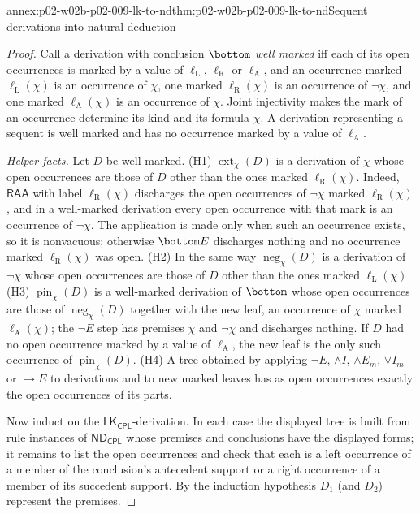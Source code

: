 \begin{annexitem}{annex:p02-w02b-p02-009-lk-to-nd}{thm:p02-w02b-p02-009-lk-to-nd}{Sequent derivations into natural deduction}
\begin{proof}
Call a derivation with conclusion \(\bottom\) \emph{well marked} iff each
of its open occurrences is marked by a value of \(\ell_{\mathrm L}\),
\(\ell_{\mathrm R}\) or \(\ell_{\mathrm A}\), and an occurrence marked
\(\ell_{\mathrm L}(\chi)\) is an occurrence of \(\chi\), one marked
\(\ell_{\mathrm R}(\chi)\) is an occurrence of \(\neg\chi\), and one marked
\(\ell_{\mathrm A}(\chi)\) is an occurrence of \(\chi\).  Joint injectivity
makes the mark of an occurrence determine its kind and its formula
\(\chi\).  A derivation representing a sequent is well marked and has no
occurrence marked by a value of \(\ell_{\mathrm A}\).

\emph{Helper facts.}  Let \(D\) be well marked.
(H1) \(\operatorname{ext}_\chi(D)\) is a derivation of \(\chi\) whose open
occurrences are those of \(D\) other than the ones marked
\(\ell_{\mathrm R}(\chi)\).  Indeed, \(\mathsf{RAA}\) with label
\(\ell_{\mathrm R}(\chi)\) discharges the open occurrences of \(\neg\chi\)
marked \(\ell_{\mathrm R}(\chi)\), and in a well-marked derivation every open
occurrence with that mark is an occurrence of \(\neg\chi\).  The application
is made only when such an occurrence exists, so it is nonvacuous; otherwise
\(\bottom E\) discharges nothing and no occurrence marked
\(\ell_{\mathrm R}(\chi)\) was open.
(H2) In the same way \(\operatorname{neg}_\chi(D)\) is a derivation of
\(\neg\chi\) whose open occurrences are those of \(D\) other than the ones
marked \(\ell_{\mathrm L}(\chi)\).
(H3) \(\operatorname{pin}_\chi(D)\) is a well-marked derivation of
\(\bottom\) whose open occurrences are those of
\(\operatorname{neg}_\chi(D)\) together with the new leaf, an occurrence of
\(\chi\) marked \(\ell_{\mathrm A}(\chi)\); the \(\neg E\) step has premises
\(\chi\) and \(\neg\chi\) and discharges nothing.  If \(D\) had no open
occurrence marked by a value of \(\ell_{\mathrm A}\), the new leaf is the only
such occurrence of \(\operatorname{pin}_\chi(D)\).
(H4) A tree obtained by applying \(\neg E\), \(\land I\), \(\land E_m\),
\(\lor I_m\) or \(\to E\) to derivations and to new marked leaves has as open
occurrences exactly the open occurrences of its parts.

Now induct on the \(\mathsf{LK}_{\mathsf{CPL}}\)-derivation.  In each case the
displayed tree is built from rule instances of
\(\mathsf{ND}_{\mathsf{CPL}}\) whose premises and conclusions have the
displayed forms; it remains to list the open occurrences and check that each
is a left occurrence of a member of the conclusion's antecedent support or a
right occurrence of a member of its succedent support.  By the induction
hypothesis \(D_1\) (and \(D_2\)) represent the premises.


\end{proof}
\end{annexitem}

